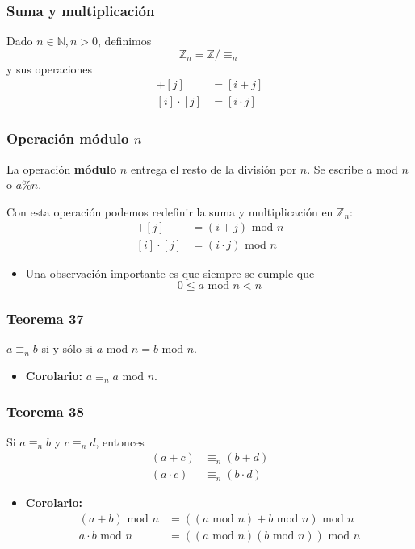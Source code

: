 \begin{multicols}{2}
    \subsubsection*{Suma y multiplicación}
    Dado $n \in \mathbb{N}, n > 0$, definimos 
    $$
    \mathbb{Z}_n = \mathbb{Z} / \equiv_n
    $$
    y sus operaciones
    \begin{align*}
        [i] + [j] &= [i + j] \\
        [i] \cdot [j] &= [i \cdot j]
    \end{align*}
    
    \subsubsection*{Operación módulo $n$}
    La operación \textbf{módulo} $n$ entrega el resto de la división por $n$. Se escribe $a$ mod $n$ o $a \% n$. \p
    
    Con esta operación podemos redefinir la suma y multiplicación en $\mathbb{Z}_n$:
    \begin{align*}
        [i] + [j] &= (i + j) \text{ mod } n\\
        [i] \cdot [j] &= (i \cdot j) \text{ mod } n
    \end{align*}
    \begin{itemize}
        \item Una observación importante es que siempre se cumple que
        $$
        0 \leq a \text{ mod } n < n
        $$
    \end{itemize}
    
    \subsubsection*{Teorema 37}
    $a \equiv_n b$ si y sólo si $a \text{ mod } n = b \text{ mod } n$.
    \begin{itemize}
        \item \textbf{Corolario:} $a \equiv_n a \text{ mod } n$.
    \end{itemize}
    
    \subsubsection*{Teorema 38}
    Si $a \equiv_n b$ y $c \equiv_n d$, entonces
    \begin{align*}
        (a + c) &\equiv_n (b + d) \\
        (a \cdot c) &\equiv_n (b \cdot d)
    \end{align*}
    \begin{itemize}
        \item \textbf{Corolario:}
        \begin{align*}
            (a + b) \text{ mod } n &= ((a \text{ mod } n) + b \text{ mod } n) \text{ mod } n \\
            a \cdot b \text{ mod } n &= ((a \text{ mod } n)(b \text{ mod } n)) \text{ mod } n \\
        \end{align*}
    \end{itemize}
    

\end{multicols}
